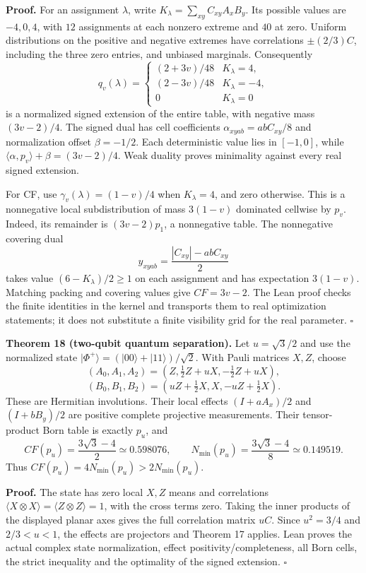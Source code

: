 \documentclass[
]{article}
\begin{document}
\textbf{Proof.} For an assignment \(\lambda\), write \(K_\lambda=\sum_{xy}C_{xy}A_xB_y\). Its possible values are \(-4,0,4\), with \(12\) assignments at each nonzero extreme and \(40\) at zero. Uniform distributions on the positive and negative extremes have correlations \(\pm(2/3)C\), including the three zero entries, and unbiased marginals. Consequently
\[
q_v(\lambda)=
\begin{cases}
(2+3v)/48&K_\lambda=4,\\
(2-3v)/48&K_\lambda=-4,\\
0&K_\lambda=0
\end{cases}
\]
is a normalized signed extension of the entire table, with negative mass \((3v-2)/4\). The signed dual has cell coefficients \(\alpha_{xyab}=abC_{xy}/8\) and normalization offset \(\beta=-1/2\). Each deterministic value lies in \([-1,0]\), while \(\langle\alpha,p_v\rangle+\beta=(3v-2)/4\). Weak duality proves minimality against every real signed extension.

For CF, use \(\gamma_v(\lambda)=(1-v)/4\) when \(K_\lambda=4\), and zero otherwise. This is a nonnegative local subdistribution of mass \(3(1-v)\) dominated cellwise by \(p_v\). Indeed, its remainder is \((3v-2)p_1\), a nonnegative table. The nonnegative covering dual
\[
y_{xyab}=\frac{|C_{xy}|-abC_{xy}}2
\]
takes value \((6-K_\lambda)/2\ge1\) on each assignment and has expectation \(3(1-v)\). Matching packing and covering values give \(CF=3v-2\). The Lean proof checks the finite identities in the kernel and transports them to real optimization statements; it does not substitute a finite visibility grid for the real parameter. \(\square\)

\textbf{Theorem 18 (two-qubit quantum separation).} Let \(u=\sqrt3/2\) and use the normalized state \(|\Phi^+\rangle=(|00\rangle+|11\rangle)/\sqrt2\). With Pauli matrices \(X,Z\), choose
\[
(A_0,A_1,A_2)=(Z,\tfrac12Z+uX,-\tfrac12Z+uX),
\]
\[
(B_0,B_1,B_2)=(uZ+\tfrac12X,X,-uZ+\tfrac12X).
\]
These are Hermitian involutions. Their local effects \((I+aA_x)/2\) and \((I+bB_y)/2\) are positive complete projective measurements. Their tensor-product Born table is exactly \(p_u\), and
\[
CF(p_u)=\frac{3\sqrt3-4}{2}\simeq0.598076,
\qquad
N_{\min}(p_u)=\frac{3\sqrt3-4}{8}\simeq0.149519.
\tag{39}
\]
Thus \(CF(p_u)=4N_{\min}(p_u)>2N_{\min}(p_u)\).

\textbf{Proof.} The state has zero local \(X,Z\) means and correlations \(\langle X\otimes X\rangle=\langle Z\otimes Z\rangle=1\), with the cross terms zero. Taking the inner products of the displayed planar axes gives the full correlation matrix \(uC\). Since \(u^2=3/4\) and \(2/3<u<1\), the effects are projectors and Theorem 17 applies. Lean proves the actual complex state normalization, effect positivity/completeness, all Born cells, the strict inequality and the optimality of the signed extension. \(\square\)
\end{document}

